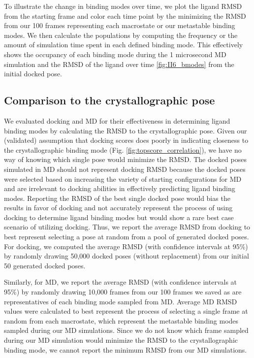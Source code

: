 \documentclass[journal=jcisd8,manuscript=article]{achemso}
\begin{document}
To illustrate the change in binding modes over time, we plot the ligand RMSD from the starting frame and color each time point by the minimizing the RMSD from our 100 frames representing each macrostate or our metastable binding modes.
We then calculate the populations by computing the frequency or the amount of simulation time spent in each defined binding mode.
This effectively shows the occupancy of each binding mode during the 1 microsecond MD simulation and the RMSD of the ligand over time \ref{fig:II6_bmodes} from the initial docked pose.

\subsection{Comparison to the crystallographic pose}
We evaluated docking and MD for their effectiveness in determining ligand binding modes by calculating the RMSD to the crystallographic pose.
Given our (validated) assumption that docking scores does poorly in indicating closeness to the crystallographic binding mode (Fig. \ref{fig:topscore_correlation}), we have no way of knowing which single pose would minimize the RMSD.
The docked poses simulated in MD should not represent docking RMSD because the docked poses were selected based on increasing the variety of starting configurations for MD and are irrelevant to docking abilities in effectively predicting ligand binding modes.
Reporting the RMSD of the best single docked pose would bias the results in favor of docking and not accurately represent the process of using docking to determine ligand binding modes but would show a rare best case scenario of utilizing docking.
Thus, we report the average RMSD from docking to best represent selecting a pose at random from a pool of generated docked poses.
For docking, we computed the average RMSD (with confidence intervals at 95\%) by randomly drawing 50,000 docked poses (without replacement) from our initial 50 generated docked poses.

Similarly, for MD, we report the average RMSD (with confidence intervals at 95\%) by randomly drawing 10,000 frames from our 100 frames we saved as are representatives of each binding mode sampled from MD.
Average MD RMSD values were calculated to best represent the process of selecting a single frame at random from each macrostate, which represent the metastable binding modes sampled during our MD simulations.
Since we do not know which frame sampled during our MD simulation would minimize the RMSD to the crystallographic binding mode, we cannot report the minimum RMSD from our MD simulations.
\end{document}
